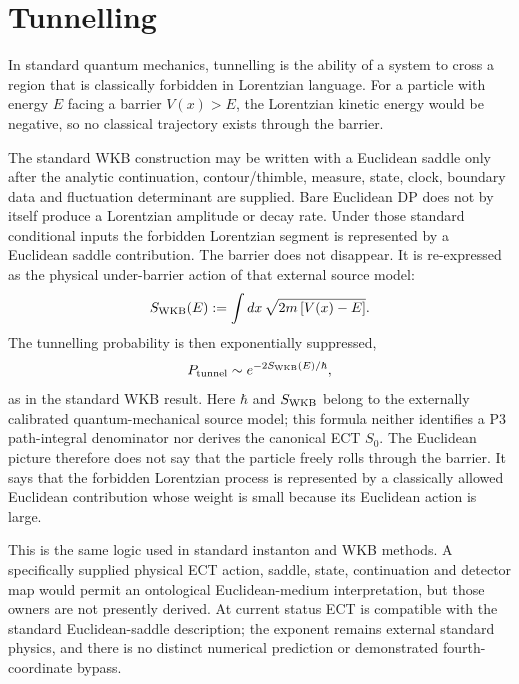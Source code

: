 \documentclass[11pt,a4paper]{article}
\begin{document}
\section{Tunnelling}

In standard quantum mechanics, tunnelling is the ability of a system
to cross a region that is classically forbidden in Lorentzian language.
For a particle with energy $E$ facing a barrier $V(x)>E$, the
Lorentzian kinetic energy would be negative, so no classical
trajectory exists through the barrier.

The standard WKB construction may be written with a Euclidean saddle only after the analytic continuation, contour/thimble, measure, state, clock, boundary data and fluctuation determinant are supplied.  Bare Euclidean DP does not by itself produce a Lorentzian amplitude or decay rate.  Under those standard conditional inputs the forbidden Lorentzian segment is represented by a Euclidean saddle contribution. The barrier does not disappear. It is re-expressed as
the physical under-barrier action of that external source model:
\[
  S_{\rm WKB}(E):=\int dx\,\sqrt{2m\,[V(x)-E]} .
\]
The tunnelling probability is then exponentially suppressed,
\[
  P_{\rm tunnel}\sim e^{-2S_{\rm WKB}(E)/\hbar},
\]
as in the standard WKB result.  Here $\hbar$ and $S_{\rm WKB}$ belong to the
externally calibrated quantum-mechanical source model; this formula neither
identifies a P3 path-integral denominator nor derives the canonical ECT
$S_0$. The Euclidean picture therefore does
not say that the particle freely rolls through the barrier. It says
that the forbidden Lorentzian process is represented by a classically
allowed Euclidean contribution whose weight is small because its
Euclidean action is large.

This is the same logic used in standard instanton and WKB methods.  A
specifically supplied physical ECT action, saddle, state, continuation and
detector map would permit an ontological Euclidean-medium interpretation, but
those owners are not presently derived.  At current status ECT is compatible
with the standard Euclidean-saddle description; the exponent remains external
standard physics, and there is no distinct numerical prediction or
demonstrated fourth-coordinate bypass.
\end{document}
